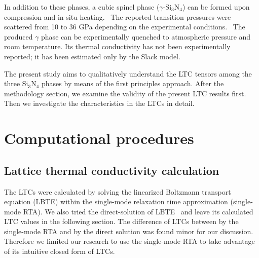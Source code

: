 \documentclass[twocolumn,amsmath,amssymb,a4paper,prb,superscriptaddress,floatfix]{revtex4-1}
\begin{document}
In addition to these phases, a cubic spinel phase ($\gamma$-Si$_3$N$_4$) can be
formed upon compression and in-situ heating.~\cite{zerr,zhang} The reported
transition pressures were scattered from 10 to 36 GPa depending on the
experimental conditions.~\cite{xu}  The produced $\gamma$ phase can be experimentally
quenched to atmospheric pressure and room temperature.  Its thermal
conductivity has not been experimentally reported; it has been estimated only
by the Slack model.~\cite{morelli} 

The present study aims to qualitatively understand the LTC tensors among the
three Si$_3$N$_4$ phases by means of the first principles approach.  After the
methodology section, we examine the validity of the present LTC results first.
Then we investigate the characteristics in the LTCs in detail.

\section{Computational procedures}

\subsection{Lattice thermal conductivity calculation}

The LTCs were calculated by solving the linearized Boltzmann transport equation
(LBTE) within the single-mode relaxation time approximation (single-mode RTA).
We also tried the direct-solution of LBTE~\cite{chaput-direct} and
leave its calculated LTC values in the following section. The
difference of LTCs between by the single-mode RTA and by the direct solution
was found minor for our discussion. Therefore we limited our research to use
the single-mode RTA to take advantage of its intuitive closed form of LTCs.
\end{document}
